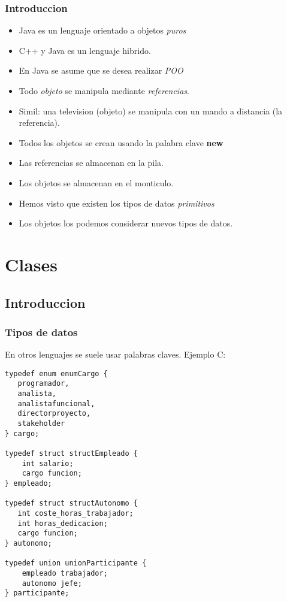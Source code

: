 \documentclass{beamer}
\begin{document}
\begin{frame}
    \frametitle{Introduccion}

\begin{itemize}[<+-| alert@+>]
      \item Java es un lenguaje orientado a objetos \emph{puros}
      \item C++ y Java es un lenguaje hibrido.
      \item En Java se asume que se desea realizar \emph{POO}      
      \item Todo \emph{objeto} se manipula mediante \emph{referencias}.
      \item Simil: una television (objeto) se manipula con un mando a distancia (la referencia).
      \item Todos los objetos se crean usando la palabra clave \bf{new}
      \item Las referencias se almacenan en la pila.
      \item Los objetos se almacenan en el monticulo.
      \item Hemos visto que existen los tipos de datos \emph{primitivos}
      \item Los objetos los podemos considerar nuevos tipos de datos.
    \end{itemize}
    \pause
\end{frame}

\section{Clases}
\subsection{Introduccion}

\begin{frame}[fragile]
    \frametitle{Tipos de datos}
      En otros lenguajes se suele usar palabras claves. Ejemplo C: \\
    \begin{center}
    
     \begin{tiny}
 \begin{verbatim}
typedef enum enumCargo {
   programador,
   analista,
   analistafuncional,
   directorproyecto,
   stakeholder
} cargo;

typedef struct structEmpleado {
    int salario;
    cargo funcion;
} empleado;

typedef struct structAutonomo {
   int coste_horas_trabajador;
   int horas_dedicacion;
   cargo funcion;
} autonomo;

typedef union unionParticipante {
    empleado trabajador;
    autonomo jefe;
} participante;
\end{verbatim}
\end{tiny}
\end{center}
\end{frame}
\end{document}
